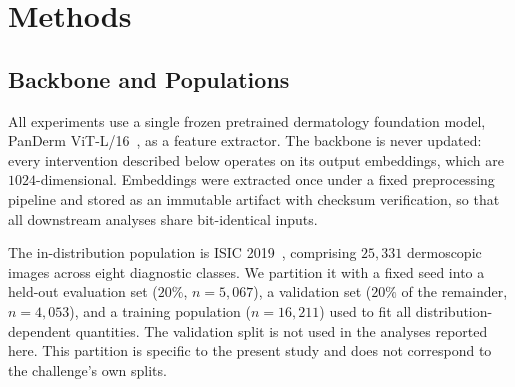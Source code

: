 %
%
%

\section{Methods}
\label{sec:methods}

\subsection{Backbone and Populations}

All experiments use a single frozen pretrained dermatology foundation model,
PanDerm ViT-L/16~\cite{yan2025panderm}, as a feature extractor. The backbone is never
updated: every intervention described below operates on its output
embeddings, which are $1024$-dimensional. Embeddings were extracted once
under a fixed preprocessing pipeline and stored as an immutable artifact with
checksum verification, so that all downstream analyses share bit-identical
inputs.

The in-distribution population is ISIC 2019~\cite{tschandl2018ham10000,%
hernandezperez2024bcn20000,codella2018isbi}, comprising $25{,}331$
dermoscopic images across eight diagnostic classes. We partition it with a
fixed seed into a held-out evaluation set ($20\%$, $n = 5{,}067$), a
validation set ($20\%$ of the remainder, $n = 4{,}053$), and a training
population ($n = 16{,}211$) used to fit all distribution-dependent
quantities. The validation split is not used in the analyses reported here.
This partition is specific to the present study and does not correspond to
the challenge's own splits.


